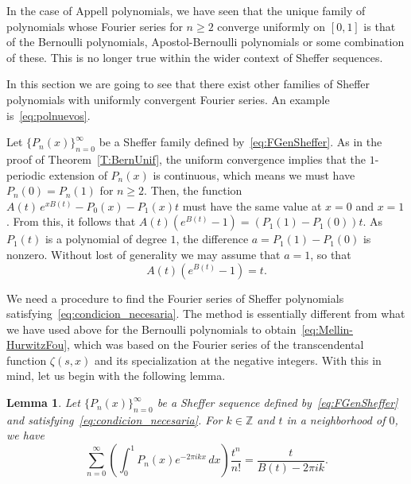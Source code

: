 \documentclass[11pt,a4paper]{amsart}
\newcommand{\Z}{\mathbb{Z}}
\theoremstyle{plain}
\theoremstyle{plain}
\theoremstyle{plain}
\newtheorem{lemma}[theorem]{Lemma}
\theoremstyle{remark}
\begin{document}
In the case of Appell polynomials, we have seen that the unique family of polynomials whose Fourier series for $n \geq 2$ converge uniformly on $[0,1]$ is that of the Bernoulli polynomials, Apostol-Bernoulli polynomials or some combination of these. This is no longer true within the wider context of Sheffer sequences.

In this section we are going to see that there exist other families of Sheffer polynomials with uniformly convergent Fourier series. An example is~\eqref{eq:polnuevos}.

Let $\{P_n(x)\}_{n=0}^{\infty}$ be a Sheffer family defined by~\eqref{eq:FGenSheffer}. As in the proof of Theorem~\ref{T:BernUnif}, the uniform convergence implies that the $1$-periodic extension of $P_n(x)$ is continuous, which means we must have $P_n(0) = P_n(1)$ for $n\geq 2$. Then, the function $A(t)\,e^{xB(t)}-P_0(x)-P_1(x)t$ must have the same value at $x=0$ and $x=1$. From this, it follows that $A(t)(e^{B(t)}-1) = (P_1(1)-P_1(0))t$. As $P_1(t)$ is a polynomial of degree $1$, the difference $a = P_1(1) - P_1(0)$ is nonzero. Without lost of generality we may assume that $a=1$, so that
\begin{equation}
\label{eq:condicion_necesaria}
  A(t)(e^{B(t)}-1) = t.
\end{equation}

We need a procedure to find the Fourier series of Sheffer polynomials satisfying~\eqref{eq:condicion_necesaria}. The method is essentially different from what we have used above for the Bernoulli polynomials to obtain~\eqref{eq:Mellin-HurwitzFou}, which was based on the Fourier series of the transcendental function $\zeta(s,x)$ and its specialization at the negative integers. With this in mind, let us begin with the following lemma.

\begin{lemma}
\label{L:coefFouGenSh}
Let $\{P_n(x)\}_{n=0}^{\infty}$ be a Sheffer sequence defined by~\eqref{eq:FGenSheffer}
and satisfying~\eqref{eq:condicion_necesaria}. For $k\in\Z$ and $t$ in a neighborhood of $0$, we have
\begin{equation}
\label{eq:GenFou}
 \sum_{n=0}^\infty \left(\int_0^1 P_n(x)e^{-2 \pi i k x}\,dx \right) \frac{t^n}{n!}
 = \frac{t}{B(t)-2 \pi i k}.
\end{equation}
\end{lemma}
\end{document}
